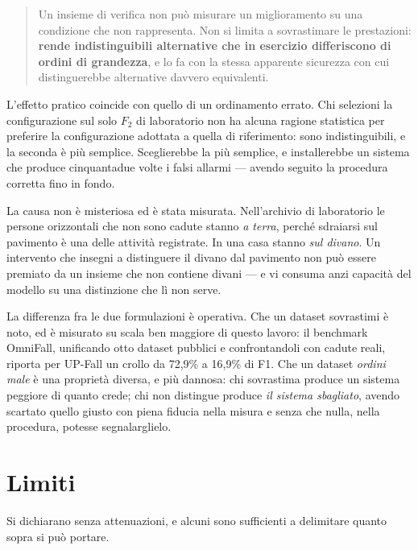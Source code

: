 \begin{quote}
Un insieme di verifica non può misurare un miglioramento su una condizione che
non rappresenta. Non si limita a sovrastimare le prestazioni: \textbf{rende
indistinguibili alternative che in esercizio differiscono di ordini di
grandezza}, e lo fa con la stessa apparente sicurezza con cui distinguerebbe
alternative davvero equivalenti.
\end{quote}

L'effetto pratico coincide con quello di un ordinamento errato. Chi selezioni
la configurazione sul solo $F_2$ di laboratorio non ha alcuna ragione
statistica per preferire la configurazione adottata a quella di riferimento:
sono indistinguibili, e la seconda è più semplice. Sceglierebbe la più
semplice, e installerebbe un sistema che produce cinquantadue volte i falsi
allarmi --- avendo seguito la procedura corretta fino in fondo.

La causa non è misteriosa ed è stata misurata. Nell'archivio di laboratorio le
persone orizzontali che non sono cadute stanno \emph{a terra}, perché
sdraiarsi sul pavimento è una delle attività registrate. In una casa stanno
\emph{sul divano}. Un intervento che insegni a distinguere il divano dal
pavimento non può essere premiato da un insieme che non contiene divani ---
e vi consuma anzi capacità del modello su una distinzione che lì non serve.

La differenza fra le due formulazioni è operativa. Che un dataset sovrastimi è noto, ed è misurato su scala ben maggiore di questo lavoro: il benchmark OmniFall, unificando otto dataset pubblici e confrontandoli con cadute reali, riporta per UP-Fall un crollo da 72,9\% a 16,9\% di F1. Che un dataset \emph{ordini male} è una proprietà diversa, e più dannosa: chi sovrastima produce un sistema peggiore di quanto crede; chi non distingue produce \emph{il sistema sbagliato}, avendo scartato quello giusto con piena fiducia nella misura e senza che nulla, nella procedura, potesse segnalarglielo.

\section{Limiti}
\label{sec:limiti}

Si dichiarano senza attenuazioni, e alcuni sono sufficienti a delimitare quanto sopra si può portare.

